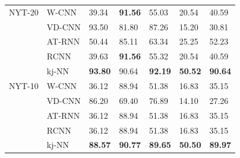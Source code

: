 \begin{table}
\begin{tabularx}{\columnwidth}{@{}XXXXXXX@{}}
NYT-20   & \gls{W-CNN}     & 39.34 & \bfseries91.56 & 55.03 & 20.54 & 40.59 \\
         & \gls{VD-CNN}    & 93.50 & 81.80 & 87.26 & 15.20 & 30.81 \\
         & \gls{AT-RNN}   & 50.44 & 85.11 & 63.34 & 25.25 & 52.23 \\
         & \gls{RCNN}      & 39.63 & \bfseries91.56 & 55.32 & 20.54 & 40.59 \\
         & \gls{kj-NN}     &\bfseries 93.80 &	90.64 &\bfseries	92.19 &\bfseries	50.52 &\bfseries	90.64 \\  \midrule
          
NYT-10   & \gls{W-CNN}     & 36.12 & 88.94 & 51.38 & 16.83 & 35.15 \\
         & \gls{VD-CNN}    & 86.20 & 69.40 & 76.89  & 14.10 & 27.26 \\
         & \gls{AT-RNN}   & 36.12 & 88.94 & 51.38 & 16.83 & 35.15 \\
         & \gls{RCNN}      & 36.12 & 88.94 & 51.38 & 16.83 & 35.15 \\
         & \gls{kj-NN}     & \bfseries 88.57 &\bfseries	90.77 &\bfseries	89.65 &\bfseries	50.50 &\bfseries	89.97 \\ \bottomrule

\end{tabularx}
\end{table}

